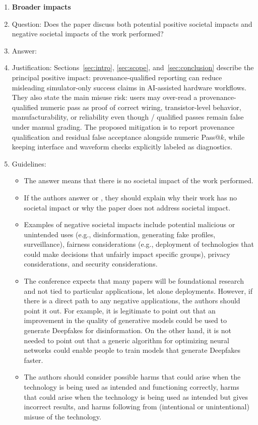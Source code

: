 \begin{enumerate}
\item {\bf Broader impacts}
    \item[] Question: Does the paper discuss both potential positive societal impacts and negative societal impacts of the work performed?
    \item[] Answer: \answerYes{}
    \item[] Justification: Sections~\ref{sec:intro}, \ref{sec:scope}, and~\ref{sec:conclusion} describe the principal positive impact: provenance-qualified reporting can reduce misleading simulator-only success claims in AI-assisted hardware workflows. They also state the main misuse risk: users may over-read a provenance-qualified numeric pass as proof of correct wiring, transistor-level behavior, manufacturability, or reliability even though \ProvFN{}/\StageProvAccepted{} qualified passes remain false under manual grading. The proposed mitigation is to report provenance qualification and residual false acceptance alongside numeric Pass@$k$, while keeping interface and waveform checks explicitly labeled as diagnostics.
    \item[] Guidelines:
    \begin{itemize}
        \item The answer \answerNA{} means that there is no societal impact of the work performed.
        \item If the authors answer \answerNA{} or \answerNo, they should explain why their work has no societal impact or why the paper does not address societal impact.
        \item Examples of negative societal impacts include potential malicious or unintended uses (e.g., disinformation, generating fake profiles, surveillance), fairness considerations (e.g., deployment of technologies that could make decisions that unfairly impact specific groups), privacy considerations, and security considerations.
        \item The conference expects that many papers will be foundational research and not tied to particular applications, let alone deployments. However, if there is a direct path to any negative applications, the authors should point it out. For example, it is legitimate to point out that an improvement in the quality of generative models could be used to generate Deepfakes for disinformation. On the other hand, it is not needed to point out that a generic algorithm for optimizing neural networks could enable people to train models that generate Deepfakes faster.
        \item The authors should consider possible harms that could arise when the technology is being used as intended and functioning correctly, harms that could arise when the technology is being used as intended but gives incorrect results, and harms following from (intentional or unintentional) misuse of the technology.

\end{itemize}
\end{enumerate}
